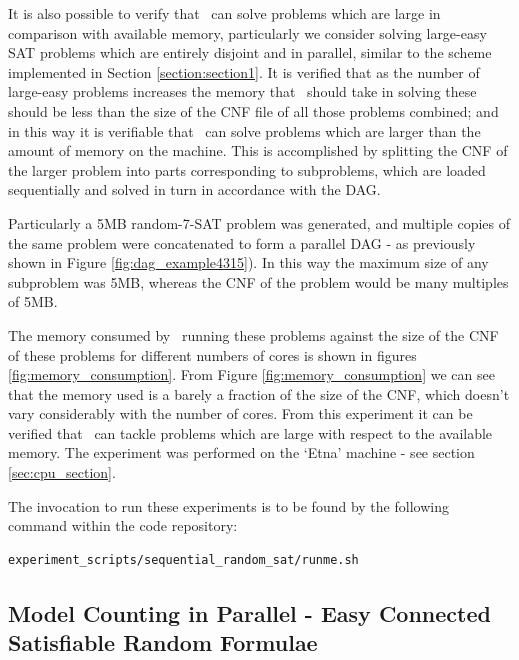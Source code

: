 \documentclass[
10pt, %
a4paper, %
oneside, %
headinclude,footinclude, %
BCOR5mm, %
]{scrartcl}
\begin{document}
It is also possible to verify that \dagster\ can solve problems which are large in comparison with available memory, particularly we consider solving large-easy SAT problems which are entirely disjoint and in parallel, similar to the scheme implemented in Section \ref{section:section1}.
It is verified that as the number of large-easy problems increases the memory that \dagster\ should take in solving these should be less than the size of the CNF file of all those problems combined; and in this way it is verifiable that \dagster\ can solve problems which are larger than the amount of memory on the machine.
This is accomplished by splitting the CNF of the larger problem into parts corresponding to subproblems, which are loaded sequentially and solved in turn in accordance with the DAG.

Particularly a 5MB random-7-SAT problem was generated, and multiple copies of the same problem were concatenated to form a parallel DAG - as previously shown in Figure \ref{fig:dag_example4315}).
In this way the maximum size of any subproblem was 5MB, whereas the CNF of the problem would be many multiples of 5MB.

The memory consumed by \dagster\ running these problems against the size of the CNF of these problems for different numbers of cores is shown in figures \ref{fig:memory_consumption}.
From Figure \ref{fig:memory_consumption} we can see that the memory used is a barely a fraction of the size of the CNF, which doesn't vary considerably with the number of cores.
From this experiment it can be verified that \dagster\ can tackle problems which are large with respect to the available memory.
The experiment was performed on the `Etna' machine - see section \ref{sec:cpu_section}.

The invocation to run these experiments is to be found by the following command within the code repository:

\begin{Verbatim}[frame=single]
experiment_scripts/sequential_random_sat/runme.sh
\end{Verbatim}




\subsection{Model Counting in Parallel - Easy Connected Satisfiable Random Formulae}\label{sec:easy_connected_problems}
\end{document}

